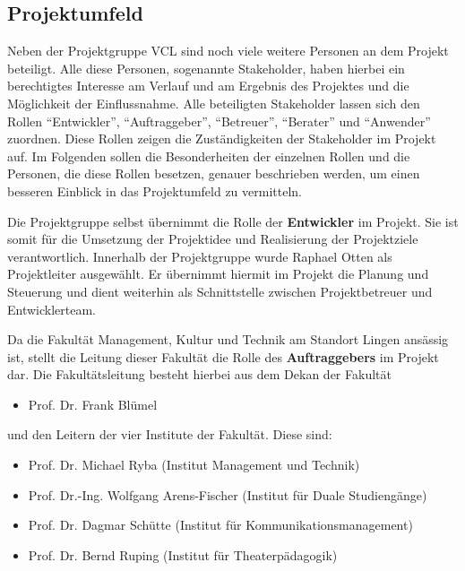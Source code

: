 \subsection{Projektumfeld}
\label{sec:Projektumfeld}

Neben der Projektgruppe \acs{VCL} sind noch viele weitere Personen an dem
Projekt beteiligt. Alle diese Personen, sogenannte Stakeholder, haben hierbei
ein berechtigtes Interesse am Verlauf und am Ergebnis des Projektes und die Möglichkeit
der Einflussnahme. Alle
beteiligten Stakeholder lassen sich den Rollen "`Entwickler"', "`Auftraggeber"',
"`Betreuer"', "`Berater"' und "`Anwender"' zuordnen. Diese Rollen zeigen die Zuständigkeiten
der Stakeholder im Projekt auf.
Im Folgenden sollen die
Besonderheiten der einzelnen Rollen und die Personen, die diese Rollen besetzen,
genauer beschrieben werden, um einen besseren Einblick in das Projektumfeld zu
vermitteln.

Die Projektgruppe selbst übernimmt die Rolle der \textbf{Entwickler} im Projekt. Sie ist
somit für die Umsetzung der Projektidee und Realisierung der Projektziele
verantwortlich. Innerhalb der Projektgruppe wurde Raphael Otten als
Projektleiter ausgewählt. Er übernimmt hiermit im Projekt die Planung und
Steuerung und dient weiterhin als Schnittstelle zwischen Projektbetreuer und
Entwicklerteam.

Da die Fakultät Management, Kultur und Technik am Standort Lingen ansässig ist,
stellt die Leitung dieser Fakultät die Rolle des \textbf{Auftraggebers} im Projekt dar.
Die Fakultätsleitung besteht hierbei aus dem Dekan der Fakultät

\begin{itemize}
  \item Prof. Dr. Frank Blümel
\end{itemize}

\clearpage

und den Leitern der vier Institute der Fakultät. Diese sind:

\begin{itemize}
  \item Prof. Dr. Michael Ryba (Institut Management und Technik)
  \item Prof. Dr.-Ing. Wolfgang Arens-Fischer (Institut für Duale Studiengänge)
  \item Prof. Dr. Dagmar Schütte (Institut für Kommunikationsmanagement)
  \item Prof. Dr. Bernd Ruping (Institut für Theaterpädagogik)
\end{itemize}

